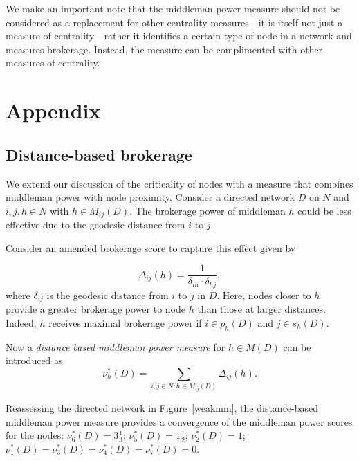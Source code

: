 \documentclass[11pt,fleqn]{article}
\begin{document}
We make an important note that the middleman power measure should not be considered as a replacement for other centrality measures---it is itself not just a measure of centrality---rather it identifies a certain type of node in a network and measures brokerage. Instead, the measure can be complimented with other measures of centrality.


\newpage

\appendix

\section{Appendix}

\subsection{Distance-based brokerage}
\label{distanceBrokerage}

We extend our discussion of the criticality of nodes with a measure that combines middleman power with node proximity. Consider a directed network $D$ on $N$ and $i,j,h \in N$ with $h \in M_{ij}(D)$. The brokerage power of middleman $h$ could be less effective due to the geodesic distance from $i$ to $j$.

Consider an amended brokerage score to capture this effect given by

\begin{equation}
\Delta_{ij}(h) = \frac{1}{\delta_{ih} \cdot \delta_{hj}},
\end{equation}
where $\delta_{ij}$ is the geodesic distance from $i$ to $j$ in $D$. Here, nodes closer to $h$ provide a greater brokerage power to node $h$ than those at larger distances. Indeed, $h$ receives maximal brokerage power if $i \in p_{h}(D)$ and $j \in s_{h}(D)$.

Now a \emph{distance based middleman power measure} for $h \in M(D)$ can be introduced as
\begin{equation}
\nu^{\ast}_h (D) = \sum_{i,j \in N \colon h \in M_{ij} (D)} \Delta_{ij} (h) .
\end{equation}

Reassessing the directed network in Figure~\ref{weakmm}, the distance-based middleman power measure provides a convergence of the middleman power scores for the nodes: $\nu^{\ast}_{6}(D) = 3 \frac{1}{3}$; $\nu^{\ast}_{5}(D) = 1 \frac{1}{2}$; $\nu^{\ast}_{2}(D) = 1$; $\nu^{\ast}_{1}(D) = \nu^{\ast}_{3}(D) = \nu^{\ast}_{4}(D) = \nu^{\ast}_{7}(D) = 0$.
\end{document}
